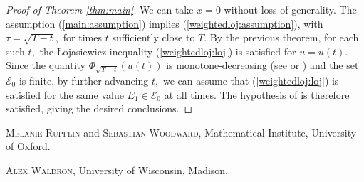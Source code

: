 \documentclass[10pt,reqno]{amsart}
\theoremstyle{plain}
\theoremstyle{definition}
\numberwithin{equation}{section}
\begin{document}
\begin{proof}[Proof of Theorem \ref{thm:main}]
We can take $x = 0$ without loss of generality. The assumption (\ref{main:assumption}) implies (\ref{weightedloj:assumption}), with $\tau = \sqrt{T - t},$ for times $t$ sufficiently close to $T.$ By the previous theorem, for each such $t,$ the \L ojasiewicz inequality (\ref{weightedloj:loj}) is satisfied for $u = u(t).$ Since the quantity $\Phi_{\sqrt{T - t}}(u(t))$ is monotone-decreasing (see \cite{struwehmsurfaces} or \cite[Theorem 3.2]{waldronweighted}) and the set $\mathcal{E}_0$ is finite, by further advancing $t,$ we can assume that (\ref{weightedloj:loj}) is satisfied for the same value $E_1 \in \mathcal{E}_0$ at all times. The hypothesis of \cite[Corollary 4.3]{waldronweighted} is therefore satisfied, giving the desired conclusions.
\end{proof}






\textsc{Melanie Rupflin} and \textsc{Sebastian Woodward}, Mathematical Institute, University of Oxford.

\textsc{Alex Waldron}, University of Wisconsin, Madison.
\end{document}
